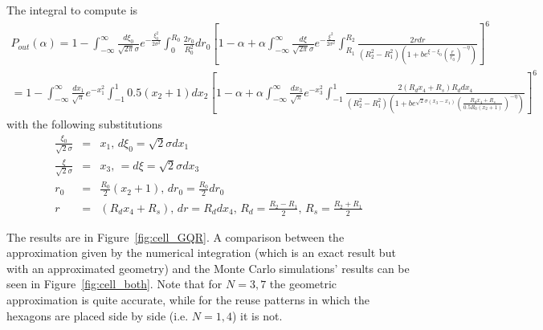 \documentclass[10pt]{article}
\begin{document}
The integral to compute is 
\begin{eqnarray}
P_{out}(\alpha)  =   1 - \int_{-\infty}^{\infty} \frac{d\xi_0}{\sqrt{2\pi}\sigma} e^{-\frac{\xi_0^2}{2\sigma^2}} \int_0^{R_0} \frac{2 r_0}{R_0^2} dr_0 \left[
  1 - \alpha + \alpha \int_{-\infty}^{\infty} 
  \frac{d\xi}{\sqrt{2\pi}\sigma} 
  e^{-\frac{\xi^2}{2\sigma^2}} 
  \int_{R_1}^{R_2} 
  \frac{2r dr}{(R_2^2-R_1^2)\left(1 + b e^{\xi - \xi_0} \left( \frac{r}{r_0} \right)^{-\eta}\right)}
  \right]^{6}
  \\
   =  1 - \int_{-\infty}^{\infty} \frac{dx_1}{\sqrt{\pi}} e^{-x_1^2} \int_{-1}^{1} 0.5(x_2+1) dx_2 \left[
  1 - \alpha + \alpha \int_{-\infty}^{\infty} 
  \frac{dx_3}{\sqrt{\pi}} 
  e^{-x_3^2} 
  \int_{-1}^{1} 
  \frac{2(R_dx_4 + R_s) R_d dx_4}{(R_2^2-R_1^2)\left(1 + b e^{\sqrt{2}\sigma(x_3 - x_1)} 
  \left( \frac{R_dx_4 + R_s}{0.5R_0(x_2+1)} \right)^{-\eta}\right)}
  \right]^{6}
\end{eqnarray}
with the following substitutions
\begin{eqnarray*}
  \frac{\xi_0}{\sqrt{2}\sigma} &=& x_1, \, d\xi_0 = \sqrt{2}\sigma dx_1 \\ 
  \frac{\xi}{\sqrt{2}\sigma} &=& x_3, \, = d\xi = \sqrt{2}\sigma dx_3  \\
  r_0 &=& \frac{R_0}{2}(x_2 + 1), \, dr_0 = \frac{R_0}{2} dr_0\\
  r &=& (R_d x_4 + R_s), \, dr = R_d dx_4, \, R_d = \frac{R_2 - R_1}{2}, \, R_s = \frac{R_2 + R_1}{2}
\end{eqnarray*}

The results are in Figure~\ref{fig:cell_GQR}. A comparison between the approximation given by the numerical integration (which is an exact result but with an approximated geometry) and the Monte Carlo simulations' results can be seen in Figure~\ref{fig:cell_both}. Note that for $N= 3, 7$ the geometric approximation is quite accurate, while for the reuse patterns in which the hexagons are placed side by side (i.e. $N= 1, 4$) it is not. 
\end{document}
